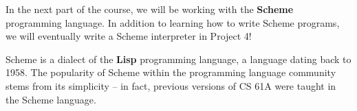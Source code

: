 In the next part of the course, we will be working with the \textbf{Scheme}
programming language. In addition to learning how to write Scheme programs, we
will eventually write a Scheme interpreter in Project 4!

Scheme is a dialect of the \textbf{Lisp} programming language, a language dating
back to 1958. The popularity of Scheme within the programming language community
stems from its simplicity -- in fact, previous versions of CS 61A were taught in
the Scheme language.
